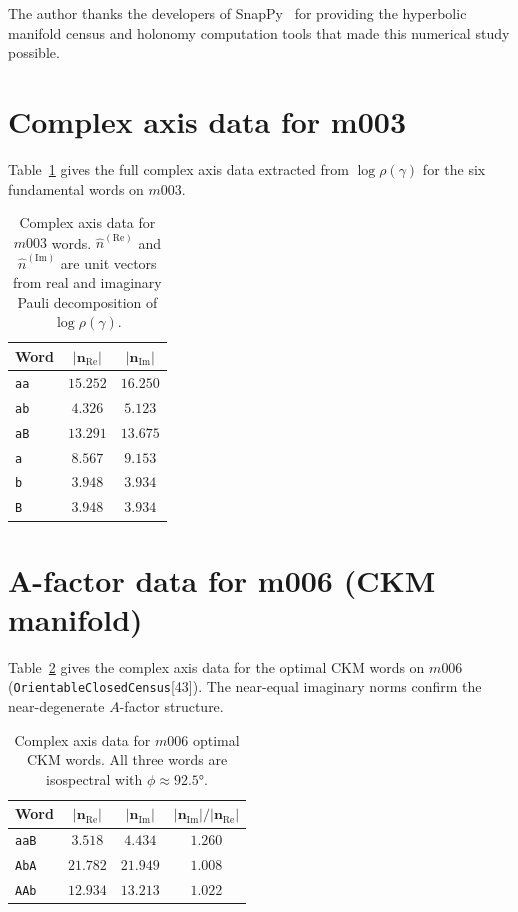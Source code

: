 \documentclass[floatfix,aps,prd,twocolumn,showpacs,superscriptaddress,longbibliography]{revtex4-2}
\begin{document}
\begin{acknowledgments}
The author thanks the developers of SnapPy~\cite{snappy} for
providing the hyperbolic manifold census and holonomy computation
tools that made this numerical study possible.
\end{acknowledgments}

\appendix

\section{Complex axis data for m003}
\label{app:complex_axes}

Table~\ref{tab:complex_axes} gives the full complex axis data
extracted from $\log\rho(\gamma)$ for the six fundamental
words on $m003$.

\begin{table}[h]
\centering
\caption{Complex axis data for $m003$ words.
$\hat{n}^{(\mathrm{Re})}$ and $\hat{n}^{(\mathrm{Im})}$ are
unit vectors from real and imaginary Pauli decomposition of
$\log\rho(\gamma)$.}
\label{tab:complex_axes}
\begin{tabular}{lcc}
\toprule
Word & $|\mathbf{n}_{\mathrm{Re}}|$ & $|\mathbf{n}_{\mathrm{Im}}|$ \\
\midrule
\texttt{aa} & $15.252$ & $16.250$ \\
\texttt{ab} & $4.326$  & $5.123$  \\
\texttt{aB} & $13.291$ & $13.675$ \\
\texttt{a}  & $8.567$  & $9.153$  \\
\texttt{b}  & $3.948$  & $3.934$  \\
\texttt{B}  & $3.948$  & $3.934$  \\
\bottomrule
\end{tabular}
\end{table}

\section{A-factor data for m006 (CKM manifold)}
\label{app:ckm_afactor}

Table~\ref{tab:ckm_complex_axes} gives the complex axis data
for the optimal CKM words on $m006$
(\texttt{OrientableClosedCensus}[43]).
The near-equal imaginary norms confirm the near-degenerate
$A$-factor structure.

\begin{table}[h]
\centering
\caption{Complex axis data for $m006$ optimal CKM words.
All three words are isospectral with $\phi \approx 92.5°$.}
\label{tab:ckm_complex_axes}
\begin{tabular}{lccc}
\toprule
Word & $|\mathbf{n}_{\mathrm{Re}}|$ & $|\mathbf{n}_{\mathrm{Im}}|$
     & $|\mathbf{n}_{\mathrm{Im}}|/|\mathbf{n}_{\mathrm{Re}}|$ \\
\midrule
\texttt{aaB} & $3.518$  & $4.434$ & $1.260$ \\
\texttt{AbA} & $21.782$ & $21.949$ & $1.008$ \\
\texttt{AAb} & $12.934$ & $13.213$ & $1.022$ \\
\bottomrule
\end{tabular}
\end{table}
\end{document}
